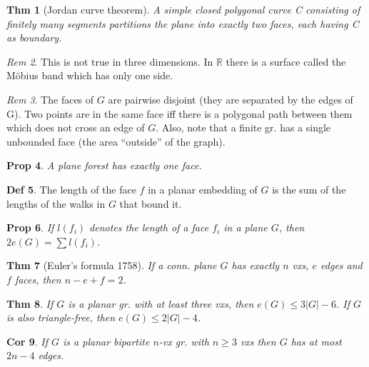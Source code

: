 \documentclass[11pt, fleqn, a4paper, landscape]{article}
\theoremstyle{plain} %
\newtheorem{thm}{Thm}
\newtheorem{pro}[thm]{Prop}
\newtheorem{cor}[thm]{Cor}
\theoremstyle{remark} %
\newtheorem{rem}[thm]{Rem}
\theoremstyle{definition} %
\newtheorem{defi}[thm]{Def}
\begin{document}
\begin{multicols}{5}
\begin{thm}[Jordan curve theorem]
A simple closed polygonal curve C consisting of finitely
many segments partitions the plane into exactly two faces, each having C as boundary.
\end{thm}

\begin{rem}
This is not true in three dimensions. In $\mathbb{R}$ there is a surface called the Möbius band which has only one side.
\end{rem}

\begin{rem}
The faces of $G$ are pairwise disjoint (they are separated by the edges of G). Two points are in the same face iff there is a polygonal path between them which does not cross an edge of $G$. Also, note that a finite gr. has a single unbounded face (the area “outside” of the graph).
\end{rem}

\begin{pro}
A plane forest has exactly one face.
\end{pro}

\begin{defi}
The length of the face $f$ in a planar embedding of $G$ is the sum of the lengths of the walks in $G$ that bound it.
\end{defi}
\addtocounter{thm}{1}
\begin{pro}
If $l(f_i)$ denotes the length of a face $f_i$ in a plane $G$, then $2e(G) = \sum l(f_i)$.
\end{pro}

\begin{thm}[Euler's formula 1758]
If a conn. plane $G$ has exactly $n$ vxs, $e$ edges
and $f$ faces, then $n - e + f = 2$.
\end{thm}

\addtocounter{thm}{1}
\begin{thm}
If $G$ is a planar gr. with at least three vxs, then $e(G) \le 3|G|- 6$. If $G$ is also triangle-free, then $e(G)\le 2|G|- 4$.
\end{thm}

\begin{cor}
If $G$ is a planar bipartite $n$-vx gr. with $n \ge 3$ vxs then $G$ has at most $2n - 4$ edges.
\end{cor}


\end{multicols}
\end{document}
